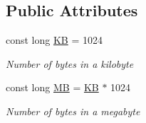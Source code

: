 \subsection*{Public Attributes}
\begin{DoxyCompactItemize}
\item 
const long \mbox{\hyperlink{class_a_d_l_1_1_pipe_stream_a497552b08f4c042b6a9d2c6be350181e}{KB}} = 1024
\begin{DoxyCompactList}\small\item\em Number of bytes in a kilobyte \end{DoxyCompactList}\item 
const long \mbox{\hyperlink{class_a_d_l_1_1_pipe_stream_ad4a04360b3d017567a0fd48defd434d0}{MB}} = \mbox{\hyperlink{class_a_d_l_1_1_pipe_stream_a497552b08f4c042b6a9d2c6be350181e}{KB}} $\ast$ 1024
\begin{DoxyCompactList}\small\item\em Number of bytes in a megabyte \end{DoxyCompactList}\end{DoxyCompactItemize}

